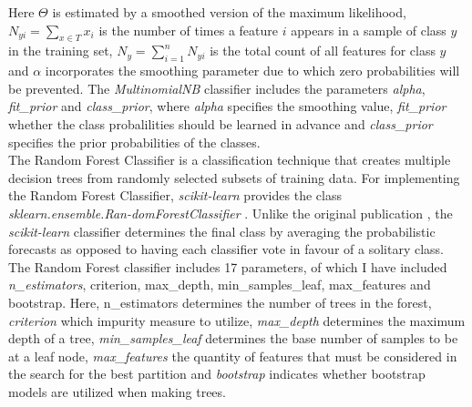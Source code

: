\documentclass[a4paper, 11pt,titlepage,oneside,openany]{book}
\begin{document}
\noindent Here $\Theta$ is estimated by a smoothed version of the maximum likelihood, $N_{yi}=\sum_{x \in T}x_i$ is the number of times a feature $i$ appears in a sample of class $y$ in the training set, $N_y=\sum_{i=1}^{n}N_{yi}$ is the total count of all features for class $y$ and $\alpha$ incorporates the smoothing parameter due to which zero probabilities will be prevented.
The \textit{MultinomialNB} classifier includes the parameters \textit{alpha}, \textit{fit\_prior} and \textit{class\_prior}, where \textit{alpha} specifies the smoothing value, \textit{fit\_prior} whether the class probalilities should be learned in advance and \textit{class\_prior} specifies the prior probabilities of the classes.\\
\indent The Random Forest Classifier is a classification technique that creates multiple decision trees from randomly selected subsets of training data. For implementing the Random Forest Classifier, \textit{scikit-learn} provides the class \textit{sklearn.ensemble.Ran-domForestClassifier} \cite{coderandomforest}. Unlike the original publication \cite{randomforest}, the \textit{scikit-learn} classifier determines the final class by averaging the probabilistic forecasts as opposed to having each classifier vote in favour of a solitary class. The Random Forest classifier includes 17 parameters, of which I have included \textit{n\_estimators}, criterion, max\_depth, min\_samples\_leaf, max\_features and bootstrap. Here, n\_estimators determines the number of trees in the forest, \textit{criterion} which impurity measure to utilize, \textit{max\_depth} determines the maximum depth of a tree, \textit{min\_samples\_leaf} determines the base number of samples to be at a leaf node, \textit{max\_features} the quantity of features that must be considered in the search for the best partition and \textit{bootstrap} indicates whether bootstrap models are utilized when making trees.\\
\end{document}

